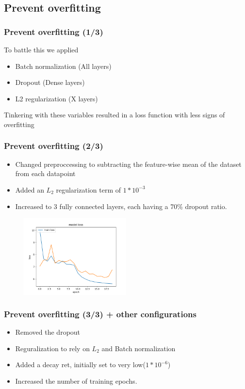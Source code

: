 \documentclass{beamer}
\begin{document}
\subsection{Prevent overfitting}
\begin{frame}
  \frametitle{Prevent overfitting (1/3)}
  To battle this we applied
  \begin{itemize}
    \item Batch normalization (All layers)
    \item Dropout (Dense layers)
    \item L2 regularization (X layers)
  \end{itemize}
  Tinkering with these variables resulted in a loss function with less signs of overfitting
\end{frame}

\begin{frame}
  \frametitle{Prevent overfitting (2/3)}
  \begin{itemize}
    \item  Changed preproccessing to subtracting the feature-wise mean of the dataset from each datapoint
    \item Added an $L_{2}$ regularization term of $1*10^{-3}$
    \item Increased to 3 fully connected layers, each having a 70\% dropout ratio.
  \end{itemize}
  \begin{figure}[!h]
  \centering
  \includegraphics[width=0.5\textwidth]{images/improved_loss_1.png}
  \end{figure}
\end{frame}


\begin{frame}
  \frametitle{Prevent overfitting (3/3) + other configurations}
  \begin{itemize}
    \item Removed the dropout
    \item Reguralization to rely on $L_{2}$ and Batch normalization
    \item Added a decay ret, initially set to very low($1*10^{-6}$)
    \item Increased the number of training epochs.
  \end{itemize}
\end{frame}
\end{document}
